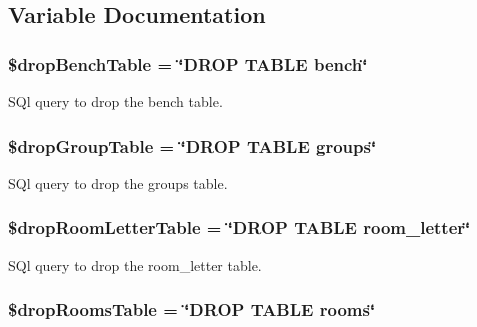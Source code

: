 \subsection{\-Variable \-Documentation}
\hypertarget{saveChanges_8php_a7313484aeb7d5b2f6345bf9982c6a9f8}{
\subsubsection[{\$drop\-Bench\-Table}]{\setlength{\rightskip}{0pt plus 5cm}\$drop\-Bench\-Table = \char`\"{}\-D\-R\-O\-P \-T\-A\-B\-L\-E bench\char`\"{}}}\label{saveChanges_8php_a7313484aeb7d5b2f6345bf9982c6a9f8}
\-S\-Ql query to drop the bench table. \hypertarget{saveChanges_8php_a18166bcedc8365797576ea4588336103}{
\subsubsection[{\$drop\-Group\-Table}]{\setlength{\rightskip}{0pt plus 5cm}\$drop\-Group\-Table = \char`\"{}\-D\-R\-O\-P \-T\-A\-B\-L\-E groups\char`\"{}}}\label{saveChanges_8php_a18166bcedc8365797576ea4588336103}
\-S\-Ql query to drop the groups table. \hypertarget{saveChanges_8php_a0d3339afd4cc2f07bb66a9886640da39}{
\subsubsection[{\$drop\-Room\-Letter\-Table}]{\setlength{\rightskip}{0pt plus 5cm}\$drop\-Room\-Letter\-Table = \char`\"{}\-D\-R\-O\-P \-T\-A\-B\-L\-E room\-\_\-letter\char`\"{}}}\label{saveChanges_8php_a0d3339afd4cc2f07bb66a9886640da39}
\-S\-Ql query to drop the room\-\_\-letter table. \hypertarget{saveChanges_8php_a8331fe5aa4e7e92b391e5cf19801f527}{
\subsubsection[{\$drop\-Rooms\-Table}]{\setlength{\rightskip}{0pt plus 5cm}\$drop\-Rooms\-Table = \char`\"{}\-D\-R\-O\-P \-T\-A\-B\-L\-E rooms\char`\"{}}}\label{saveChanges_8php_a8331fe5aa4e7e92b391e5cf19801f527}
